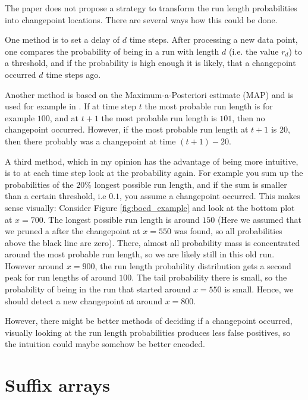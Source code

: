 \documentclass[12pt,a4paper]{article}
\begin{document}
The paper \cite{Adams:BayesianOnlineChangepoint} does not propose a strategy to transform the run length probabilities into changepoint locations. There are several ways how this could be done.

One method is to set a delay of $d$ time steps. After processing a new data point, one compares the probability of being in a run with length $d$ (i.e. the value $r_d$) to a threshold, and if the probability is high enough it is likely, that a changepoint occurred $d$ time steps ago.

Another method is based on the Maximum-a-Posteriori estimate (MAP)  and is used for example in \cite{Knoblauch:SpatiotemporalBayesian}. If at time step $t$ the most probable run length is for example $100$, and at $t+1$ the most probable run length is $101$, then no changepoint occurred. However, if the most probable run length at $t+1$ is $20$, then there probably was a changepoint at time $(t+1)-20$.

A third method, which in my opinion has the advantage of being more intuitive, is to at each time step look at the probability again. For example you sum up the probabilities of the $20\%$ longest possible run length, and if the sum is smaller than a certain threshold, i.e $0.1$, you assume a changepoint occurred. This makes sense visually: Consider Figure \ref{fig:bocd_example} and look at the bottom plot at $x=700$. The longest possible run length is around $150$ (Here we assumed that we pruned a after the changepoint at $x=550$ was found, so all probabilities above the black line are zero). There, almost all probability mass is concentrated around the most probable run length, so we are likely still in this old run. However around $x=900$, the run length probability distribution gets a second peak for run lengths of around $100$. The tail probability there is small, so the probability of being in the run that started around $x=550$ is small. Hence, we should detect a new changepoint at around $x=800$.

However, there might be better methods of deciding if a changepoint occurred, visually looking at the run length probabilities produces less false positives, so the intuition could maybe somehow be better encoded. 


\hypertarget{suffix-arrays}{%
\section{Suffix arrays}\label{suffix-arrays}}
\end{document}
